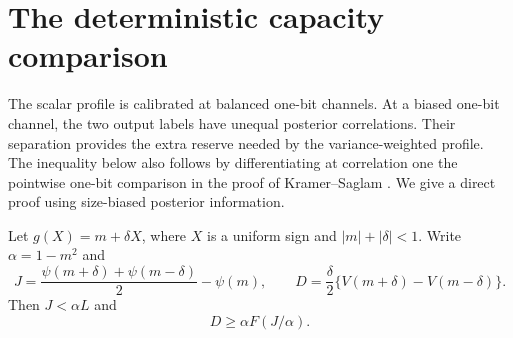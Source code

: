 \section{The deterministic capacity comparison}
\label{capacity:section}

The scalar profile is calibrated at balanced one-bit channels.  At a
biased one-bit channel, the two output labels have unequal posterior
correlations.  Their separation provides the extra reserve needed by
the variance-weighted profile.
The inequality below also follows by differentiating at correlation
one the pointwise one-bit comparison in the proof of
Kramer--Saglam \cite[Lemma~2.4]{KramerSaglam2026}.
We give a direct proof using size-biased posterior information.

\begin{lemma}
\label{capacity:onebit}
Let $g(X)=m+\delta X$, where $X$ is a uniform sign and
$|m|+|\delta|<1$.  Write $\alpha=1-m^2$ and
\[
 J=\frac{\psi(m+\delta)+\psi(m-\delta)}2-\psi(m),
 \qquad D=\frac\delta2\{V(m+\delta)-V(m-\delta)\}.
\]
Then $J<\alpha L$ and
\begin{equation}
 D\ge\alpha F(J/\alpha).
 \label{capacity:refined}
\end{equation}
\end{lemma}


